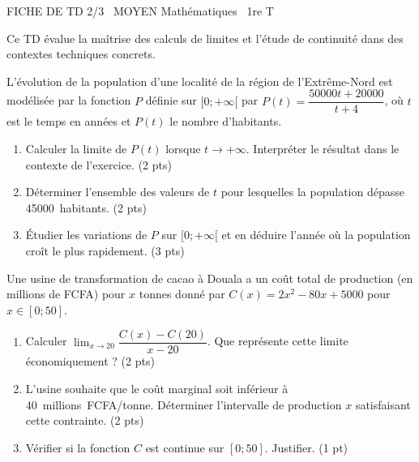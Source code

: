 \documentclass[11pt]{article}
\begin{document}
\begin{tcolorbox}[enhanced,colback=popink,colframe=popink,arc=10pt,boxrule=0pt,left=12pt,right=12pt,top=9pt,bottom=9pt]
{\color{white}\popxbold\small FICHE DE TD 2/3 \textbullet\ MOYEN \hfill Mathématiques \textbullet\ 1re T\par}
\end{tcolorbox}
\vspace{4pt}
Ce TD évalue la maîtrise des calculs de limites et l'étude de continuité dans des contextes techniques concrets.

\begin{exercice}
L'évolution de la population d'une localité de la région de l'Extrême-Nord est modélisée par la fonction $P$ définie sur $[0; +\infty[$ par $P(t) = \dfrac{50000t + 20000}{t + 4}$, où $t$ est le temps en années et $P(t)$ le nombre d'habitants.
\begin{enumerate}
    \item Calculer la limite de $P(t)$ lorsque $t \to +\infty$. Interpréter le résultat dans le contexte de l'exercice. (2 pts)
    \item Déterminer l'ensemble des valeurs de $t$ pour lesquelles la population dépasse \SI{45000}{habitants}. (2 pts)
    \item Étudier les variations de $P$ sur $[0; +\infty[$ et en déduire l'année où la population croît le plus rapidement. (3 pts)
\end{enumerate}
\end{exercice}

\begin{exercice}
Une usine de transformation de cacao à Douala a un coût total de production (en millions de FCFA) pour $x$ tonnes donné par $C(x) = 2x^2 - 80x + 5000$ pour $x \in [0; 50]$.
\begin{enumerate}
    \item Calculer $\lim_{x \to 20} \dfrac{C(x) - C(20)}{x - 20}$. Que représente cette limite économiquement ? (2 pts)
    \item L'usine souhaite que le coût marginal soit inférieur à \SI{40}{millions FCFA/tonne}. Déterminer l'intervalle de production $x$ satisfaisant cette contrainte. (2 pts)
    \item Vérifier si la fonction $C$ est continue sur $[0; 50]$. Justifier. (1 pt)
\end{enumerate}
\end{exercice}
\end{document}
